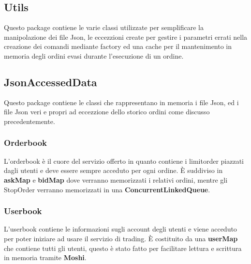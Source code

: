 \documentclass{article}
\begin{document}
\subsection{Utils}
Questo package contiene le varie classi utilizzate per semplificare la manipolazione dei file Json, le eccezzioni create per gestire i parametri errati nella creazione dei comandi mediante factory ed una cache per il mantenimento in memoria degli ordini evasi durante l'esecuzione di un ordine.
\newpage
\subsection{JsonAccessedData}
Questo package contiene le classi che rappresentano in memoria i file Json, ed i file Json veri e propri ad eccezzione dello storico ordini come discusso precedentemente.

\subsubsection{Orderbook}
L'orderbook è il cuore del servizio offerto in quanto contiene i limitorder piazzati dagli utenti e deve essere sempre acceduto per ogni ordine. È suddiviso in \textbf{askMap} e \textbf{bidMap} dove verranno memorizzati i relativi ordini, mentre gli StopOrder verranno memorizzati in una \textbf{ConcurrentLinkedQueue}.
\subsubsection{Userbook}
L'userbook contiene le informazioni sugli account degli utenti e viene acceduto per poter iniziare ad usare il servizio di trading. È costituito da una \textbf{userMap} che contiene tutti gli utenti, questo è stato fatto per facilitare lettura e scrittura in memoria tramite \textbf{Moshi}. 
\end{document}
